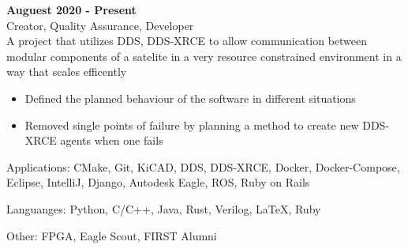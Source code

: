 \documentclass[10pt]{article}
\newcommand{\entrySpacing}{4pt}
\begin{document}
\noindent\begin{minipage}{\linewidth}
 \hfill \textbf{Auguest 2020 - Present}\\
Creator, Quality Assurance, Developer\hfill \\A project that utilizes DDS, DDS-XRCE to allow communication between modular components of a satelite in a very resource constrained environment in a way that scales efficently
\begin{itemize}[noitemsep,nolistsep]
\item Defined the planned behaviour of the software in different situations
\item Removed single points of failure by planning a method to create new DDS-XRCE agents when one fails
\end{itemize}


\end{minipage}
\vspace{\entrySpacing}


Applications: CMake, Git, KiCAD, DDS, DDS-XRCE, Docker, Docker-Compose, Eclipse, IntelliJ, Django, Autodesk Eagle, ROS, Ruby on Rails

Languanges: Python, C/C++, Java, Rust, Verilog, \LaTeX, Ruby

Other: FPGA, Eagle Scout, FIRST Alumni
\end{document}
